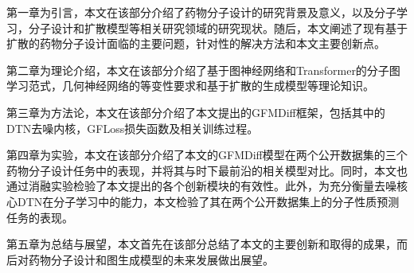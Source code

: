 第一章为引言，本文在该部分介绍了药物分子设计的研究背景及意义，以及分子学习，分子设计和扩散模型等相关研究领域的研究现状。随后，本文阐述了现有基于扩散的药物分子设计面临的主要问题，针对性的解决方法和本文主要创新点。

第二章为理论介绍，本文在该部分介绍了基于图神经网络和Transformer的分子图学习范式，几何神经网络的等变性要求和基于扩散的生成模型等理论知识。

第三章为方法论，本文在该部分介绍了本文提出的GFMDiff框架，包括其中的DTN去噪内核，GFLoss损失函数及相关训练过程。

第四章为实验，本文在该部分介绍了本文的GFMDiff模型在两个公开数据集的三个药物分子设计任务中的表现，并将其与时下最前沿的相关模型对比。同时，本文也通过消融实验检验了本文提出的各个创新模块的有效性。此外，为充分衡量去噪核心DTN在分子学习中的能力，本文检验了其在两个公开数据集上的分子性质预测任务的表现。

第五章为总结与展望，本文首先在该部分总结了本文的主要创新和取得的成果，而后对药物分子设计和图生成模型的未来发展做出展望。